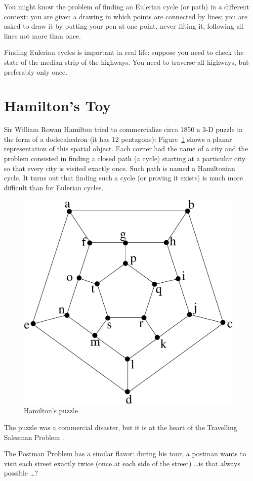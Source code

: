 You might know the problem of finding an Eulerian cycle (or path) in a
different context: you are given a drawing in which points are
connected by lines; you are asked to draw it by putting your pen at
one point, never lifting it, following all lines not more than once.

Finding Eulerian cycles is important in real life: suppose you need to
check the state of the median strip of the highways. You need to
traverse all highways, but preferably only once.

\section{Hamilton's Toy}

Sir William Rowan Hamilton tried to commercialize circa 1850 a 3-D
puzzle in the form of a dodecahedron (it has 12 pentagons):
Figure~\ref{hamilton1} shows a planar representation of this spatial
object. Each corner had the name of a city and the problem consisted
in finding a closed path (a cycle) starting at a particular city so
that every city is visited exactly once. Such path is named a
Hamiltonian cycle. It turns out that finding such a cycle (or proving
it exists) is much more difficult than for Eulerian cycles.

\begin{figure}[ht]
\begin{center}
\includegraphics[width=0.4\linewidth,keepaspectratio]{hamilton}
\end{center}
\caption{Hamilton's puzzle
\label{hamilton1}}
\end{figure}

The puzzle was a commercial disaster, but it is at the heart of the
Travelling Salesman Problem .

The Postman Problem has a similar flavor: during his tour, a postman
wants to visit each street exactly twice (once at each side of the
street) \ldots is that always possible \ldots?

